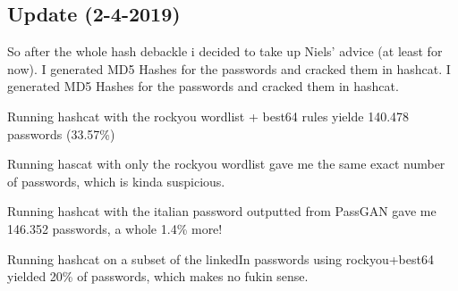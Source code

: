 \subsection{Update (2-4-2019)}

So after the whole hash debackle i decided to take up Niels' advice (at least for now). I generated MD5 Hashes for the passwords and cracked them in hashcat. I generated MD5 Hashes for the passwords and cracked them in hashcat.

Running hashcat with the rockyou wordlist + best64 rules yielde 140.478 passwords (33.57\%)

Running hascat with only the rockyou wordlist gave me the same exact number of passwords, which is kinda suspicious.

Running hashcat with the italian password outputted from PassGAN gave me 146.352 passwords, a whole 1.4\% more!

Running hashcat on a subset of the linkedIn passwords using rockyou+best64 yielded 20\% of passwords, which makes no fukin sense.

